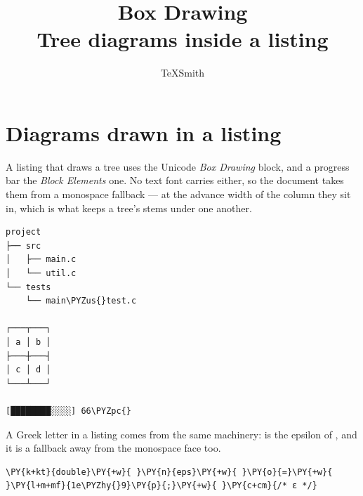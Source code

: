 \documentclass[a4paper,twoside]{article}
\title{Box Drawing\\[0.5em]\large Tree diagrams inside a listing}
\author{TeXSmith}\date{}
\begin{document}
\maketitle
\section{Diagrams drawn in a listing}
A listing that draws a tree uses the Unicode \emph{Box Drawing} block, and a
progress bar the \emph{Block Elements} one. No text font carries either, so the
document takes them from a monospace fallback --- at the advance width of the
column they sit in, which is what keeps a tree's stems under one another.
\begin{tscode}[lang=text, stretch=0.5, engine=pygments]
\begin{Verbatim}[commandchars=\\\{\},breaklines, breakanywhere, commandchars=\\\{\}]
project
├── src
│   ├── main.c
│   └── util.c
└── tests
    └── main\PYZus{}test.c

┌───┬───┐
│ a │ b │
├───┼───┤
│ c │ d │
└───┴───┘

[████████░░░░] 66\PYZpc{}
\end{Verbatim}
\end{tscode}
A Greek letter in a listing comes from the same machinery:  is the
epsilon of , and it is a fallback away from the monospace
face too.
\begin{tscode}[lang=c, engine=pygments]
\begin{Verbatim}[commandchars=\\\{\},breaklines, breakanywhere, commandchars=\\\{\}]
\PY{k+kt}{double}\PY{+w}{ }\PY{n}{eps}\PY{+w}{ }\PY{o}{=}\PY{+w}{ }\PY{l+m+mf}{1e\PYZhy{}9}\PY{p}{;}\PY{+w}{ }\PY{c+cm}{/* ε */}
\end{Verbatim}
\end{tscode}
\end{document}
